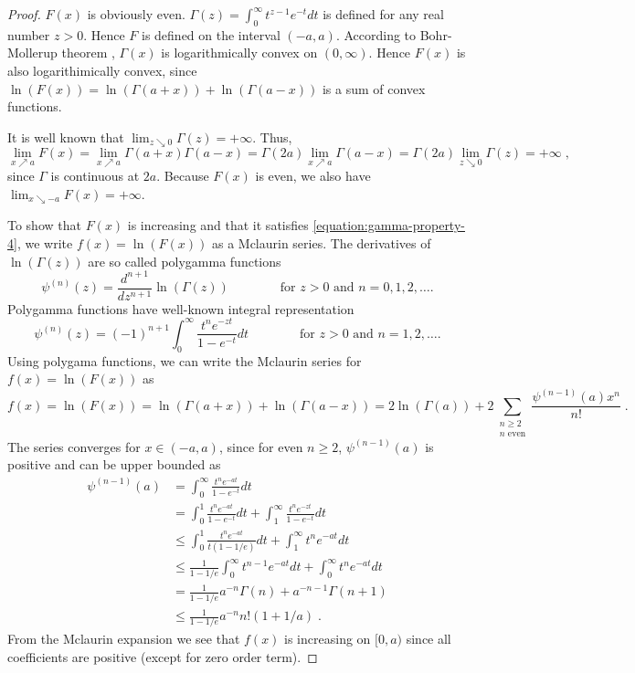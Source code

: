 \begin{proof}
$F(x)$ is obviously even. $\Gamma(z) = \int_0^\infty t^{z-1} e^{-t} dt$ is
defined for any real number $z > 0$. Hence $F$ is defined on the interval
$(-a,a)$. According to Bohr-Mollerup theorem \cite[Theorem 2.1]{Artin-1964},
$\Gamma(x)$ is logarithmically convex on $(0,\infty)$. Hence $F(x)$ is also
logarithimically convex, since $\ln (F(x)) = \ln(\Gamma(a+x)) +
\ln(\Gamma(a-x))$ is a sum of convex functions.

It is well known that $\lim_{z \searrow 0} \Gamma(z) = +\infty$. Thus,
\[
\lim_{x \nearrow a} F(x)
= \lim_{x \nearrow a} \Gamma(a+x) \Gamma(a-x)
= \Gamma(2a) \lim_{x \nearrow a} \Gamma(a-x)
= \Gamma(2a) \lim_{z \searrow 0} \Gamma(z)
= + \infty \; ,
\]
since $\Gamma$ is continuous at $2a$. Because $F(x)$ is even, we also have
$\lim_{x \searrow -a} F(x) = +\infty$.

To show that $F(x)$ is increasing and that it satisfies
\eqref{equation:gamma-property-4}, we write $f(x) = \ln(F(x))$ as a Mclaurin series.
The derivatives of $\ln(\Gamma(z))$ are so called polygamma functions
\[
\psi^{(n)}(z) = \frac{d^{n+1}}{dz^{n+1}} \ln(\Gamma(z))
\qquad \qquad \text{for $z > 0$ and $n=0,1,2,\dots$.}
\]
Polygamma functions have well-known integral representation
\[
\psi^{(n)}(z) = (-1)^{n+1} \int_0^\infty \frac{t^n e^{-zt}}{1 - e^{-t}} dt
\qquad \qquad \text{for $z > 0$ and $n=1,2,\dots$.}
\]
Using polygama functions, we can write the Mclaurin series for $f(x) = \ln(F(x))$ as
\[
f(x) = \ln(F(x)) = \ln(\Gamma(a+x)) + \ln(\Gamma(a-x)) = 2 \ln(\Gamma(a)) + 2 \sum_{\substack{n \ge 2 \\ \text{$n$ even}}} \frac{\psi^{(n-1)}(a) x^n}{n!} \; .
\]
The series converges for $x \in (-a,a)$, since
for even $n \ge 2$, $\psi^{(n-1)}(a)$ is positive and can be upper bounded as
\begin{align*}
\psi^{(n-1)}(a)
& = \int_0^\infty \frac{t^n e^{-at}}{1 - e^{-t}} dt \\
& = \int_0^1 \frac{t^n e^{-at}}{1 - e^{-t}} dt + \int_1^\infty \frac{t^n e^{-zt}}{1 - e^{-t}} dt \\
& \le \int_0^1 \frac{t^n e^{-at}}{t(1 - 1/e)} dt + \int_1^\infty t^n e^{-at} dt \\
& \le \frac{1}{1 - 1/e} \int_0^\infty t^{n-1} e^{-at} dt + \int_0^\infty t^n e^{-at} dt \\
& = \frac{1}{1 - 1/e} a^{-n} \Gamma(n) + a^{-n-1} \Gamma(n+1) \\
& \le \frac{1}{1 - 1/e} a^{-n} n! (1 + 1/a) \; .
\end{align*}
From the Mclaurin expansion we see that $f(x)$ is increasing on $[0,a)$
since all coefficients are positive (except for zero order term).


\end{proof}
